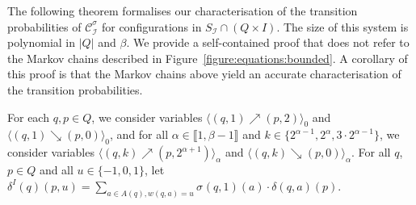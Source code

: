 \documentclass[a4paper,UKenglish,cleveref,autoref,thm-restate,colorlinks]{lipics-v2021}
\newcommand{\integerInterval}[1]{\llbracket{}#1\rrbracket{}}
\newcommand{\mdpStateSpace}{S}
\newcommand{\weight}{w}
\newcommand{\weightVal}{u}
\newcommand{\ocStateSpace}{Q}
\newcommand{\ocState}{q}
\newcommand{\ocStateB}{p}
\newcommand{\ocCount}{k}
\newcommand{\ocActionSpace}{A}
\newcommand{\ocAction}{a}
\newcommand{\ocTrans}{\delta}
\newcommand{\mchain}{\mathcal{C}}
\newcommand{\intPart}{\mathcal{I}}
\newcommand{\interval}{I}
\newcommand{\powerIndex}{\alpha}
\newcommand{\powerMax}{\beta}
\newcommand{\compressChainStrat}[1]{\mchain^{#1}_{\intPart}}
\newcommand{\compressChain}{\compressChainStrat{\strat}}
\newcommand{\compressChainStateSpace}{\mdpStateSpace_{\intPart}}
\newcommand{\upProbaVar}[5]{\langle (#1,#2)\nearrow{}(#3,#4)\rangle_{#5}}
\newcommand{\downProbaVar}[5]{\langle (#1,#2)\searrow{}(#3,#4)\rangle_{#5}}
\newcommand{\stratGeneric}[1]{{\sigma_{#1}}}
\newcommand{\strat}{\stratGeneric{}}
\begin{document}
The following theorem  formalises our characterisation of the transition probabilities of $\compressChain$ for configurations in $\compressChainStateSpace\cap(\ocStateSpace\times\interval)$.
The size of this system is polynomial in $|\ocStateSpace|$ and $\powerMax$.
We provide a self-contained proof that does not refer to the Markov chains described in Figure~\ref{figure:equations:bounded}.
A corollary of this proof is that the Markov chains above yield an accurate characterisation of the transition probabilities.
\begin{theorem}\label{theorem:equations:transitions}
    For each $\ocState, \ocStateB\in\ocStateSpace$, we consider variables $\upProbaVar{\ocState}{1}{\ocStateB}{2}{0}$ and $\downProbaVar{\ocState}{1}{\ocStateB}{0}{0}$, and for all $\powerIndex\in\integerInterval{1, \powerMax-1}$ and $\ocCount\in\{2^{\powerIndex-1}, 2^\powerIndex, 3\cdot 2^{\powerIndex-1}\}$, we consider variables $\upProbaVar{\ocState}{\ocCount}{\ocStateB}{2^{\powerIndex+1}}{\powerIndex}$ and $\downProbaVar{\ocState}{\ocCount}{\ocStateB}{0}{\powerIndex}$.
  For all $\ocState$, $\ocStateB\in\ocStateSpace$ and all $\weightVal\in\{-1, 0, 1\}$, let $\ocTrans^\interval(\ocState)(\ocStateB, \weightVal) = \sum_{\ocAction\in\ocActionSpace(\ocState), \weight(\ocState, \ocAction)=\weightVal}\strat(\ocState, 1)(\ocAction)\cdot\ocTrans(\ocState, \ocAction)(\ocStateB)$.


\end{theorem}
\end{document}

